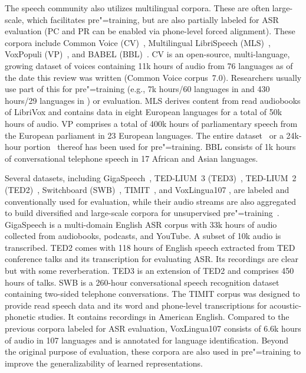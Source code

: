 The speech community also utilizes multilingual corpora. These are often
large-scale, which facilitates pre"=training, but are also partially labeled for ASR
evaluation (PC and PR can be enabled via phone-level forced alignment). These
corpora include Common Voice (CV)~\parencite{ardila_common_2020}, Multilingual
LibriSpeech (MLS)~\parencite{pratap_mls_2020}, VoxPopuli 
(VP)~\parencite{wang_voxpopuli_2021}, and BABEL (BBL)~\parencite{gales_speech_2014}. CV is
an open-source, multi-language, growing dataset of voices containing 11k hours
of audio from 76 languages as of the date this review was written (Common Voice
corpus~7.0). Researchers usually use part of this for pre"=training (e.g., 7k
hours/60 languages in \parencite{babu_xlsr_2021} and 430 hours/29 languages in
\parencite{kawakami_learning_2020}) or evaluation. 
MLS derives content from read audiobooks of LibriVox and contains data in eight
European languages for a total of 50k hours of audio. VP comprises a total of 400k
hours of parliamentary speech from the European parliament in 23 European
languages.
The entire dataset~\parencite{babu_xlsr_2021} or a 24k-hour 
portion~\parencite{chen_unispeechsat_2021, chen_wavlm_2021} thereof has been used for pre"=training. BBL
consists of 1k hours of conversational telephone speech in 17 African and Asian
languages.

Several datasets, including GigaSpeech~\parencite{chen_gigaspeech_2021}, TED-LIUM~3
(TED3)~\parencite{hernandez_tedlium_2018}, TED-LIUM~2 (TED2)~\parencite{rousseau_tedlium_2012},
Switchboard (SWB)~\parencite{godfrey_switchboard_1992}, 
TIMIT~\parencite{garofolo_timit_1993}, and VoxLingua107 \parencite{valk_voxlingua107_2021}, are
labeled and conventionally used for evaluation, while their audio streams are
also aggregated to build diversified and large-scale corpora for unsupervised
pre"=training~\parencite{kawakami_learning_2020, song_speechxlnet_2020, babu_xlsr_2021}.
GigaSpeech is a multi-domain English ASR corpus with 33k hours of audio
collected from audiobooks, podcasts, and YouTube. A subset of 10k audio is
transcribed. TED2 comes with 118 hours of English speech extracted from
TED conference talks and its transcription for evaluating ASR. Its recordings
are clear but with some reverberation. TED3 is an extension of TED2 and
comprises 450 hours of talks. SWB is a 260-hour conversational speech
recognition dataset containing two-sided telephone conversations.
The TIMIT corpus was designed to provide read speech data and its word and
phone-level transcriptions for acoustic-phonetic studies. It contains recordings
in American English. Compared to the previous corpora labeled for ASR
evaluation, VoxLingua107 consists of 6.6k hours of audio in 107 languages and
is annotated for language identification. Beyond the original purpose of
evaluation, these corpora are also used in pre"=training to improve the
generalizability of learned representations.

